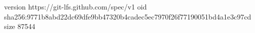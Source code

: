 version https://git-lfs.github.com/spec/v1
oid sha256:9771b8abd22dc69dfe9bb47320b4cadec5ec7970f26f77190051bd4a1e3c97cd
size 87544

